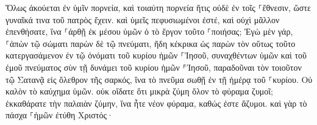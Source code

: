 \documentclass{openreader}
\begin{document}
Ὅλως ἀκούεται ἐν ὑμῖν πορνεία, καὶ τοιαύτη πορνεία ἥτις οὐδὲ ἐν τοῖς ⸀ἔθνεσιν, ὥστε γυναῖκά τινα τοῦ πατρὸς ἔχειν. 
καὶ ὑμεῖς πεφυσιωμένοι ἐστέ, καὶ οὐχὶ μᾶλλον ἐπενθήσατε, ἵνα ⸀ἀρθῇ ἐκ μέσου ὑμῶν ὁ τὸ ἔργον τοῦτο ⸀ποιήσας; 
Ἐγὼ μὲν γάρ, ⸀ἀπὼν τῷ σώματι παρὼν δὲ τῷ πνεύματι, ἤδη κέκρικα ὡς παρὼν τὸν οὕτως τοῦτο κατεργασάμενον 
ἐν τῷ ὀνόματι τοῦ κυρίου ἡμῶν ⸀Ἰησοῦ, συναχθέντων ὑμῶν καὶ τοῦ ἐμοῦ πνεύματος σὺν τῇ δυνάμει τοῦ κυρίου ἡμῶν ⸁Ἰησοῦ, 
παραδοῦναι τὸν τοιοῦτον τῷ Σατανᾷ εἰς ὄλεθρον τῆς σαρκός, ἵνα τὸ πνεῦμα σωθῇ ἐν τῇ ἡμέρᾳ τοῦ ⸀κυρίου. 
Οὐ καλὸν τὸ καύχημα ὑμῶν. οὐκ οἴδατε ὅτι μικρὰ ζύμη ὅλον τὸ φύραμα ζυμοῖ; 
ἐκκαθάρατε τὴν παλαιὰν ζύμην, ἵνα ἦτε νέον φύραμα, καθώς ἐστε ἄζυμοι. καὶ γὰρ τὸ πάσχα ⸀ἡμῶν ἐτύθη Χριστός· 
\end{document}
